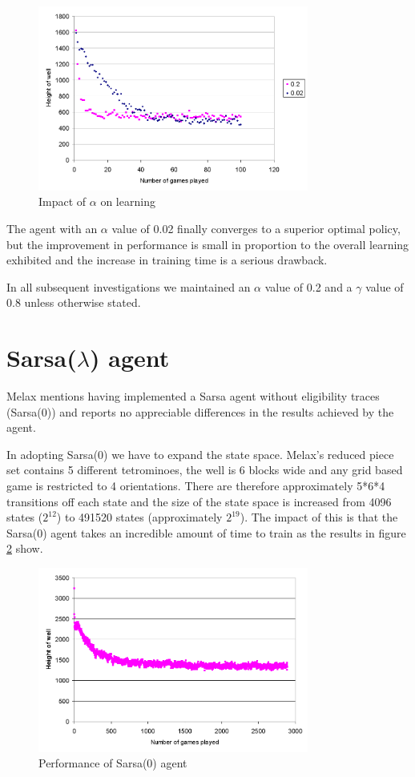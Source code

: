 \documentclass{rucsthesis}
\begin{document}
\begin{figure}[h]
\centering
\includegraphics[width=3.5in]{alphacomp.png}
\caption{Impact of $\alpha$ on learning}
\label{fig:alpha}
\end{figure} 

The agent with an $\alpha$ value of 0.02 finally converges to a superior optimal policy, but the improvement in performance is small in proportion to the overall learning exhibited and the increase in training time is a serious drawback.

In all subsequent investigations we maintained an $\alpha$ value of 0.2 and a $\gamma$ value of 0.8 unless otherwise stated.

\section{Sarsa($\lambda$) agent}

Melax mentions having implemented a Sarsa agent without eligibility traces (Sarsa(0)) and reports no appreciable differences in the results achieved by the agent. 

In adopting Sarsa(0) we have to expand the state space. Melax's reduced piece set contains 5 different tetrominoes, the well is 6 blocks wide and any grid based game is restricted to 4 orientations. There are therefore approximately 5*6*4 transitions off each state and the size of the state space is increased from 4096 states ($2^{12}$) to 491520 states (approximately $2^{19}$). The impact of this is that the Sarsa(0) agent takes an incredible amount of time to train as the results in figure \ref{fig:melaxsarsa} show.

\begin{figure}[h]
\centering
\includegraphics[width=3.5in]{sarsamelax.png}
\caption{Performance of Sarsa(0) agent}
\label{fig:melaxsarsa}
\end{figure} 
\end{document}
